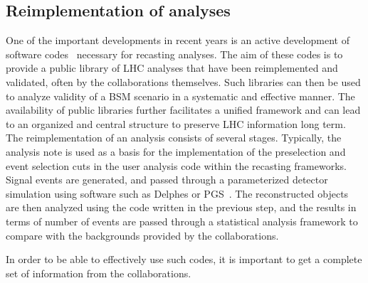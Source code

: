 \subsection{Reimplementation of analyses}

One of the important developments in recent years is an active development of software codes~\cite{Dumont:2014tja, Conte:2014zja, Kim:2015wza,Cranmer:2010hk,ATOM,Barducci:2014ila} necessary for recasting analyses. The aim of these codes is to provide a public library of LHC analyses that have been reimplemented and validated, often by the collaborations themselves. Such libraries can then be used to analyze validity of a BSM scenario in a systematic and effective manner. The availability of public libraries further facilitates a unified framework and can lead to an organized and central structure to preserve LHC information long term.
The reimplementation of an analysis consists of several stages. Typically, the analysis note is used as a basis for the implementation of the preselection and event selection cuts in the user analysis code within the recasting frameworks. Signal events are generated, and passed through a parameterized detector simulation using software such as Delphes or PGS~\cite{deFavereau:2013fsa,PGS}. The reconstructed objects are then analyzed using the code written in the previous step, and the results in terms of number of events are passed through a statistical analysis framework to compare with the backgrounds provided by the collaborations. 

In order to be able to effectively use such codes, it is important to get a complete set of information from the collaborations. 

